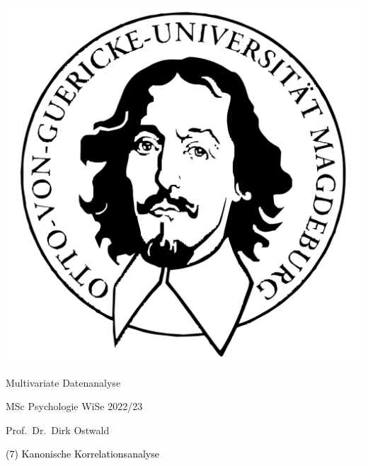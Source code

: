 \documentclass[
  8pt,
  ignorenonframetext,
]{beamer}
\author{}
\date{\vspace{-2.5em}}
\begin{document}
\begin{frame}[plain]{}
\protect\hypertarget{section}{}
\center

\begin{center}\includegraphics[width=0.2\linewidth]{7_Abbildungen/mvda_7_otto} \end{center}

\vspace{2mm}

\Huge

Multivariate Datenanalyse \vspace{6mm}

\Large

MSc Psychologie WiSe 2022/23

\vspace{6mm}
\large

Prof.~Dr.~Dirk Ostwald
\end{frame}

\begin{frame}[plain]{}
\protect\hypertarget{section-1}{}
\vfill
\center
\huge

\textcolor{black}{(7) Kanonische Korrelationsanalyse} \vfill
\end{frame}
\end{document}
